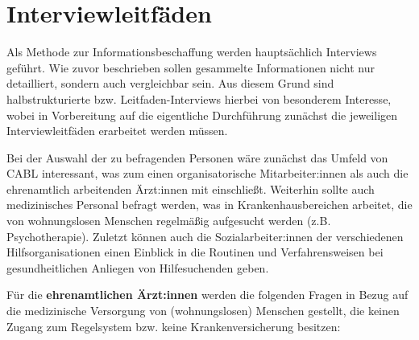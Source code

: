\section{Interviewleitfäden}

Als Methode zur Informationsbeschaffung werden hauptsächlich Interviews geführt. Wie zuvor beschrieben sollen gesammelte Informationen nicht nur detailliert, sondern auch vergleichbar sein. Aus diesem Grund sind halbstrukturierte bzw. Leitfaden-Interviews hierbei von besonderem Interesse, wobei in Vorbereitung auf die eigentliche Durchführung zunächst die jeweiligen Interviewleitfäden erarbeitet werden müssen.

Bei der Auswahl der zu befragenden Personen wäre zunächst das Umfeld von CABL interessant, was zum einen organisatorische Mitarbeiter:innen als auch die ehrenamtlich arbeitenden Ärzt:innen mit einschließt. Weiterhin sollte auch medizinisches Personal befragt werden, was in Krankenhausbereichen arbeitet, die von wohnungslosen Menschen regelmäßig aufgesucht werden (z.B. Psychotherapie). Zuletzt können auch die Sozialarbeiter:innen der verschiedenen Hilfsorganisationen einen Einblick in die Routinen und Verfahrensweisen bei gesundheitlichen Anliegen von Hilfesuchenden geben.

Für die \textbf{ehrenamtlichen Ärzt:innen} werden die folgenden Fragen in Bezug auf die medizinische Versorgung von (wohnungslosen) Menschen gestellt, die keinen Zugang zum Regelsystem bzw. keine Krankenversicherung besitzen:

